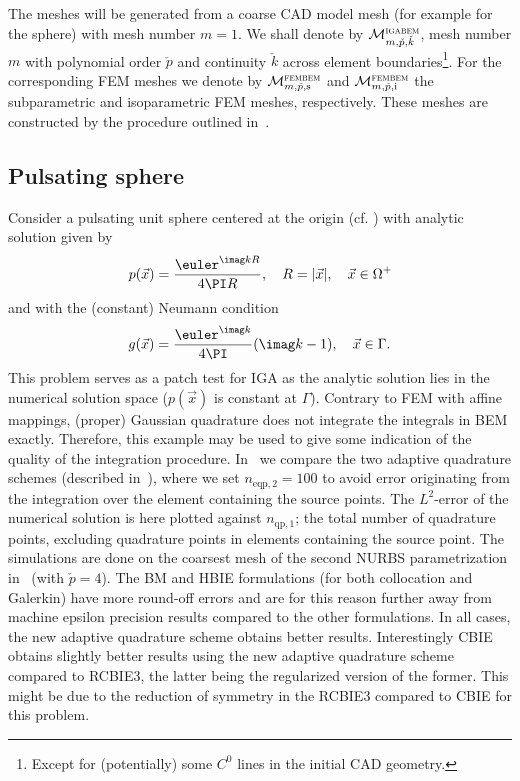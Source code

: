 The meshes will be generated from a coarse CAD model mesh (for example  for the sphere) with mesh number $m=1$. We shall denote by ${\cal M}_{m,\check{p},\check{k}}^{\textsc{igabem}}$, mesh number $m$ with polynomial order $\check{p}$ and continuity $\check{k}$ across element boundaries\footnote{Except for (potentially) some $C^0$ lines in the initial CAD geometry.}. For the corresponding FEM meshes we denote by ${\cal M}_{m,\check{p},\mathrm{s}}^{\textsc{fembem}}$ and ${\cal M}_{m,\check{p},\mathrm{i}}^{\textsc{fembem}}$ the subparametric and isoparametric FEM meshes, respectively. These meshes are constructed by the procedure outlined in~\cite[p. 191]{Venas2018iao}.

\subsection{Pulsating sphere}
\label{Sec3:pulsatingSphere}
Consider a pulsating unit sphere centered at the origin (cf. \cite{Simpson2014aib,Zheng2015itb}) with analytic solution given by
\begin{equation}
	p(\vec{x}) = \frac{\euler^{\imag kR}}{4\PI R},\quad R=|\vec{x}|,\quad \vec{x}\in\Omega^+
\end{equation}
and with the (constant) Neumann condition
\begin{equation}
	g(\vec{x}) = \frac{\euler^{\imag k}}{4\PI}(\imag k -1),\quad \vec{x}\in\Gamma.
\end{equation}
This problem serves as a patch test for IGA as the analytic solution lies in the numerical solution space ($p(\vec{x})$ is constant at $\Gamma$). Contrary to FEM with affine mappings, (proper) Gaussian quadrature does not integrate the integrals in BEM exactly. Therefore, this example may be used to give some indication of the quality of the integration procedure. In~ we compare the two adaptive quadrature schemes (described in~), where we set $n_{\mathrm{eqp},2}=100$ to avoid error originating from the integration over the element containing the source points. The $L^2$-error of the numerical solution is here plotted against $n_{\mathrm{qp},1}$; the total number of quadrature points, excluding quadrature points in elements containing the source point. The simulations are done on the coarsest mesh of the second NURBS parametrization in~ (with $\check{p}=4$). The BM and HBIE formulations (for both collocation and Galerkin) have more round-off errors and are for this reason further away from machine epsilon precision results compared to the other formulations. In all cases, the new adaptive quadrature scheme obtains better results. Interestingly CBIE obtains slightly better results using the new adaptive quadrature scheme compared to RCBIE3, the latter being the regularized version of the former. This might be due to the reduction of symmetry in the RCBIE3 compared to CBIE for this problem.

